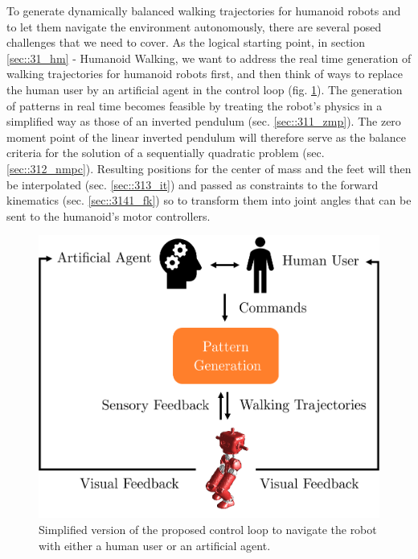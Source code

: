 To generate dynamically balanced walking trajectories for humanoid robots and to let them navigate the environment autonomously, there are several posed challenges that we need to cover. As the logical starting point, in section \ref{sec::31_hm} - Humanoid Walking, we want to address the real time generation of walking trajectories for humanoid robots first, and then think of ways to replace the human user by an artificial agent in the control loop (fig. \ref{fig::3_cl}). The generation of patterns in real time becomes feasible by treating the robot's physics in a simplified way as those of an inverted pendulum (sec. \ref{sec::311_zmp}). The zero moment point of the linear inverted pendulum will therefore serve as the balance criteria for the solution of a sequentially quadratic problem (sec. \ref{sec::312_nmpc}).  Resulting positions for the center of mass and the feet will then be interpolated (sec. \ref{sec::313_it}) and passed as constraints to the forward kinematics (sec. \ref{sec::3141_fk}) so to transform them into joint angles that can be sent to the humanoid's motor controllers.
\begin{figure}[h]
	\centering
	\includegraphics[scale=.5]{chapters/03_background/img/control_loop.png}
	\caption{\label{fig::3_cl} Simplified version of the proposed control loop to navigate the robot with either a human user or an artificial agent.}
\end{figure}
\\

